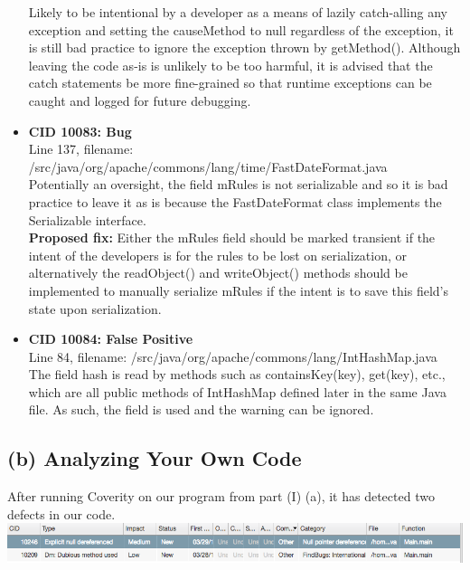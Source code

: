 \documentclass{article}
\begin{document}
\begin{itemize}
    Likely to be intentional by a developer as a means of lazily catch-alling any exception and setting the causeMethod
    to null regardless of the exception, it is still bad practice to ignore the exception thrown by getMethod(). Although
    leaving the code as-is is unlikely to be too harmful, it is advised that the catch statements be more fine-grained so that 
    runtime exceptions can be caught and logged for future debugging.
\item \textbf{CID 10083: Bug} \\
    Line 137, filename: /src/java/org/apache/commons/lang/time/FastDateFormat.java \\
    Potentially an oversight, the field mRules is not serializable and so it is bad practice to leave it 
    as is because the FastDateFormat class implements the Serializable interface. \\
    \textbf{Proposed fix:} Either the mRules field should be marked transient if the intent of the developers 
    is for the rules to be lost on serialization, or alternatively the readObject() and writeObject() methods 
    should be implemented to manually serialize mRules if the intent is to save this field's state upon serialization.
\item \textbf{CID 10084: False Positive} \\
    Line 84, filename: /src/java/org/apache/commons/lang/IntHashMap.java \\
    The field hash is read by methods such as containsKey(key), get(key), etc., which are all public methods of
    IntHashMap defined later in the same Java file. As such, the field is used and the warning can be ignored.
\end{itemize}

\subsection*{(b) Analyzing Your Own Code}
After running Coverity on our program from part (I) (a), it has detected two defects in our code. \\
\includegraphics[scale=0.5]{ss/coverity_bugs.png} \\
\end{document}
